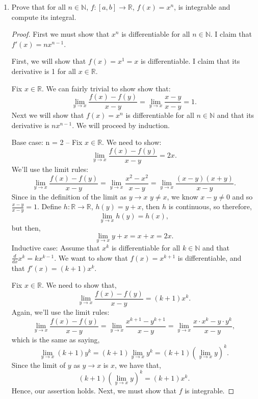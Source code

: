 \documentclass[12pt]{amsart}
\begin{document}
\begin{enumerate}
\begin{proof}
\bigskip

We want to find the sum of the area under the left half of the graph and the right half of the graph, so we have:
%
\[ \sum_{i=0}^n f\left( \frac{2i}{2n+1} \right) \Delta x_i = \sum_{i=0}^n f\left( \frac{2i}{2n+1} \right) \cdot \frac 2 {2n+1}, \]
%
for the left half and,
%
\[ \sum_{i=n+1}^{2n+1} f\left( \frac{2i}{2n+1} \right) \Delta x_i=\sum_{i=n+1}^{2n+1} 2\cdot\frac 2{n+1}, \]
%
for the right half.
\end{proof}

\item Prove that for all $n\in \mathbb{N}$, $f : [a,b]\rightarrow
  \mathbb{R}$, $f(x)=x^n$, is integrable and compute its integral.
%
%

\begin{proof}
First we must show that $x^n$ is differentiable for all $n\in \mathbb N$. I claim that $f'(x) = nx^{n-1}$. 

First, we will show that $f(x) = x^1=x$ is differentiable. I claim that its derivative is 1 for all $x\in\mathbb R$.

Fix $x\in \mathbb R$. We can fairly trivial to show show that:
%
\[ \lim_{y\to x} \frac {f(x) - f(y)}{x-y} = \lim_{y\to x} \frac {x - y}{x-y} = 1. \]
%
Next we will show that $f(x) = x^n$ is differentiable for all $n\in\mathbb N$ and that its derivative is $nx^{n-1}$. We will proceed by induction. 

Base case: n = 2 -- Fix $x \in \mathbb R$. We need to show:
%
\[ \lim_{y\to x} \frac {f(x) - f(y)} {x-y} = 2x. \]
%
We'll use the limit rules:
%
\[ \lim_{y \to x} \frac {f(x) - f(y)} {x-y} = \lim_{y \to x} \frac {x^2 - x^2} {x-y} = \lim_{y \to x}  \frac {(x-y)(x+y)} {x-y}. \]
%
Since in the definition of the limit as $y \to x$ $y\not=x$, we know $x-y\not=0$ and so $\tfrac{x-y}{x-y}=1$. Define $h:\mathbb R \to \mathbb R$, $h(y) = y+x$, then $h$ is continuous, so therefore,
%
\[ \lim_{y\to x} h(y) = h(x), \]
%
but then,
%
\[ \lim_{y\to x} y+x = x+x = 2x. \]
%
Inductive case: Assume that $x^k$ is differentiable for all $k \in \mathbb N$ and that $\tfrac{d}{dx} x^k = kx^{k-1}$. We want to show that $f(x)=x^{k+1}$ is differentiable, and that $f'(x) = (k+1)x^k$.

Fix $x\in \mathbb R$. We need to show that,
%
\[ \lim_{y\to x} \frac {f(x) - f(y)} {x-y} = (k+1)x^k. \]
%
Again, we'll use the limit rules:
%
\[  \lim_{y \to x} \frac {f(x) - f(y)} {x-y} = \lim_{y \to x} \frac {x^{k+1} - y^{k+1}} {x-y} =\lim_{y \to x} \frac {x\cdot x^k - y\cdot y^k} {x-y}, \]
%
which is the same as saying,
%
\[ \lim_{y\to x} (k+1) y^k = (k+1) \lim_{y\to x}  y^k = (k+1) \left(\lim_{y\to x}  y\right)^k.  \]
%
Since the limit of $y$ as $y\to x$ is $x$, we have that,
%
\[  (k+1) \left(\lim_{y\to x}  y\right)^k = (k+1) x^k. \]
%
Hence, our assertion holds. Next, we must show that $f$ is integrable.


\end{proof}
\end{enumerate}
\end{document}
